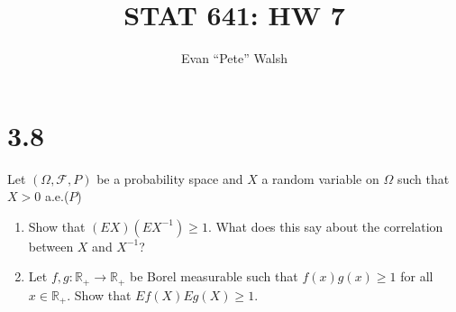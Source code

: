 \documentclass[12pt]{article}
\title{STAT 641: HW 7}
\author{Evan ``Pete'' Walsh}
\begin{document}
\maketitle

\section*{3.8}
Let $(\Omega, \mathcal{F}, P)$ be a probability space and $X$ a random variable on $\Omega$ such that $X > 0$ a.e.($P$)
\begin{enumerate}[label=(\alph*)]
\item Show that $(EX)(EX^{-1}) \geq 1$. What does this say about the correlation between $X$ and $X^{-1}$?

\item Let $f,g : \mathbb{R}_{+}\rightarrow \mathbb{R}_{+}$ be Borel measurable such that $f(x)g(x) \geq 1$ for all $x \in \mathbb{R}_{+}$. Show
that $Ef(X)Eg(X) \geq 1$.
\end{enumerate}
\end{document}
